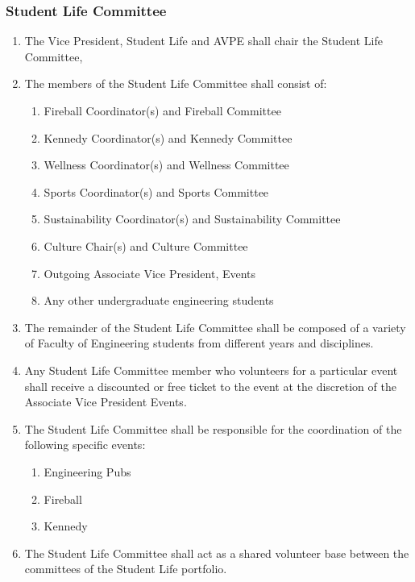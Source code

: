 \subsubsection{Student Life Committee}
\label{student-life-committee}
\begin{enumerate}
 \item
  The Vice President, Student Life and AVPE shall chair the Student Life Committee,
 \item
  The members of the Student Life Committee shall consist of:

  \begin{enumerate}
   \item
    Fireball Coordinator(s) and Fireball Committee
   \item
    Kennedy Coordinator(s) and Kennedy Committee
   \item
    Wellness Coordinator(s) and Wellness Committee
   \item
    Sports Coordinator(s) and Sports Committee
   \item
    Sustainability Coordinator(s) and Sustainability Committee
   \item
    Culture Chair(s) and Culture Committee
   \item
    Outgoing Associate Vice President, Events
   \item
    Any other undergraduate engineering students
  \end{enumerate}
 \item
  The remainder of the Student Life Committee shall be composed of a variety of Faculty of Engineering students from different years and disciplines.
 \item
  Any Student Life Committee member who volunteers for a particular event shall receive a discounted or free ticket to the event at the discretion of the Associate Vice President Events.
 \item
  The Student Life Committee shall be responsible for the coordination of the following specific events:

  \begin{enumerate}
   \item
    Engineering Pubs
   \item
    Fireball
   \item
    Kennedy

  \end{enumerate}
 \item
  The Student Life Committee shall act as a shared volunteer base between the committees of the Student Life portfolio.
\end{enumerate}

